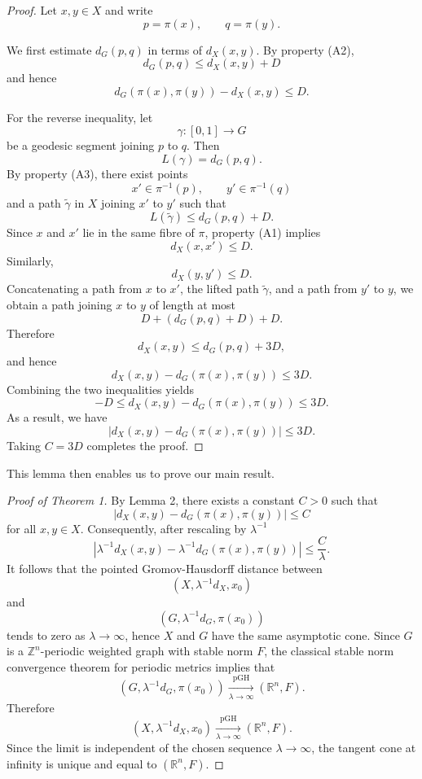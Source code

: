 \documentclass[12pt, letterpaper]{article}
\begin{document}
\begin{proof}
Let $x,y\in X$ and write
\[
p=\pi(x),\qquad q=\pi(y).
\]

\noindent
We first estimate $d_G(p,q)$ in terms of $d_X(x,y)$.  By property {\rm(A2)},
\[
d_G(p,q)\le d_X(x,y)+D
\]
and hence
\[
d_G(\pi(x),\pi(y))-d_X(x,y)\le D.
\]

\noindent
For the reverse inequality, let
\[
\gamma:[0,1]\to G
\]
be a geodesic segment joining $p$ to $q$. Then
\[
L(\gamma)=d_G(p,q).
\]
By property {\rm(A3)}, there exist points
\[
x'\in \pi^{-1}(p), \qquad
y'\in \pi^{-1}(q)
\]
and a path $\widetilde{\gamma}$ in $X$ joining $x'$ to $y'$ such that
\[
L(\widetilde{\gamma})
\le d_G(p,q)+D.
\]
Since $x$ and $x'$ lie in the same fibre of $\pi$, property {\rm(A1)}
implies
\[
d_X(x,x')\le D.
\]
Similarly,
\[
d_X(y,y')\le D.
\]
Concatenating a path from $x$ to $x'$, the lifted path
$\widetilde{\gamma}$, and a path from $y'$ to $y$, we obtain a path
joining $x$ to $y$ of length at most
\[
D+(d_G(p,q)+D)+D.
\]
Therefore
\[
d_X(x,y)\le d_G(p,q)+3D,
\]
and hence
\[
d_X(x,y)-d_G(\pi(x),\pi(y))
\le 3D.
\]
Combining the two inequalities yields
\[
-D
\le
d_X(x,y)-d_G(\pi(x),\pi(y))
\le
3D.
\]
As a result, we have
\[
\bigl|d_X(x,y)-d_G(\pi(x),\pi(y))\bigr|
\le 3D.
\]
Taking $C=3D$ completes the proof.
\end{proof}

\noindent
This lemma then enables us to prove our main result.

\begin{proof}[Proof of Theorem 1] 
By Lemma 2, there exists a constant $C>0$ such that
\[
|d_X(x,y)-d_G(\pi(x),\pi(y))|
\le C
\]
for all $x,y\in X$.  Consequently, after rescaling by $\lambda^{-1}$
\[
\left|
\lambda^{-1}d_X(x,y)-
\lambda^{-1}d_G(\pi(x),\pi(y))
\right|
\le \frac{C}{\lambda}.
\]
It follows that the pointed Gromov-Hausdorff distance between
\[
(X,\lambda^{-1}d_X,x_0)
\]
and
\[
(G,\lambda^{-1}d_G,\pi(x_0))
\]
tends to zero as $\lambda\to\infty$, hence $X$ and $G$ have the same asymptotic cone.  Since $G$ is a $\mathbb Z^n$-periodic weighted graph with stable norm
$F$, the classical stable norm convergence theorem for periodic metrics
implies that
\[
(G,\lambda^{-1}d_G,\pi(x_0))
\xrightarrow[\lambda\to\infty]{\mathrm{pGH}}
(\mathbb R^n,F).
\]
Therefore
\[
(X,\lambda^{-1}d_X,x_0)
\xrightarrow[\lambda\to\infty]{\mathrm{pGH}}
(\mathbb R^n,F).
\]
Since the limit is independent of the chosen sequence
$\lambda\to\infty$, the tangent cone at infinity is unique and equal to
$(\mathbb R^n,F)$.
\end{proof}
\end{document}
